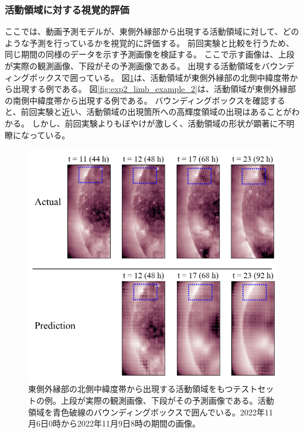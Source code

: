       \subsubsection{活動領域に対する視覚的評価}
        ここでは、動画予測モデルが、東側外縁部から出現する活動領域に対して、どのような予測を行っているかを視覚的に評価する。
        前回実験と比較を行うため、同じ期間の同様のデータを示す予測画像を検証する。
        ここで示す画像は、上段が実際の観測画像、下段がその予測画像である。
        出現する活動領域をバウンディングボックスで囲っている。
        図\ref{fig:exp2_limb_example_1}は、活動領域が東側外縁部の北側中緯度帯から出現する例である。
        図\ref{fig:exp2_limb_example_2}は、活動領域が東側外縁部の南側中緯度帯から出現する例である。
        バウンディングボックスを確認すると、前回実験と近い、活動領域の出現箇所への高輝度領域の出現はあることがわかる。
        しかし、前回実験よりもぼやけが激しく、活動領域の形状が顕著に不明瞭になっている。
        \begin{figure}[htbp]
          \centering
          \includegraphics[width=\textwidth]{figures/exp2/limb_sample_3_caption.jpg}
          \caption{東側外縁部の北側中緯度帯から出現する活動領域をもつテストセットの例。上段が実際の観測画像、下段がその予測画像である。活動領域を青色破線のバウンディングボックスで囲んでいる。2022年11月6日0時から2022年11月9日8時の期間の画像。}
          \label{fig:exp2_limb_example_1}
        \end{figure}
